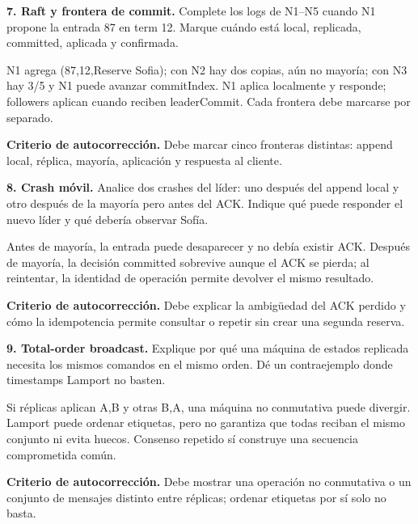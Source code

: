 \documentclass[variant=guiaresuelta,cover=institutional,mode=screen]{ua-engineering-v6-article}
\begin{document}
\begin{uaexercise}
\textbf{7. Raft y frontera de commit.} Complete los logs de N1--N5 cuando N1 propone la entrada 87 en term 12. Marque cuándo está local, replicada, committed, aplicada y confirmada.
\end{uaexercise}
\begin{uaanswer}
N1 agrega (87,12,Reserve Sofia); con N2 hay dos copias, aún no mayoría; con N3 hay 3/5 y N1 puede avanzar commitIndex. N1 aplica localmente y responde; followers aplican cuando reciben leaderCommit. Cada frontera debe marcarse por separado.

\par\smallskip\textbf{Criterio de autocorrección.} Debe marcar cinco fronteras distintas: append local, réplica, mayoría, aplicación y respuesta al cliente.
\end{uaanswer}

\begin{uaexercise}
\textbf{8. Crash móvil.} Analice dos crashes del líder: uno después del append local y otro después de la mayoría pero antes del ACK. Indique qué puede responder el nuevo líder y qué debería observar Sofía.
\end{uaexercise}
\begin{uaanswer}
Antes de mayoría, la entrada puede desaparecer y no debía existir ACK. Después de mayoría, la decisión committed sobrevive aunque el ACK se pierda; al reintentar, la identidad de operación permite devolver el mismo resultado.

\par\smallskip\textbf{Criterio de autocorrección.} Debe explicar la ambigüedad del ACK perdido y cómo la idempotencia permite consultar o repetir sin crear una segunda reserva.
\end{uaanswer}

\begin{uaexercise}
\textbf{9. Total-order broadcast.} Explique por qué una máquina de estados replicada necesita los mismos comandos en el mismo orden. Dé un contraejemplo donde timestamps Lamport no basten.
\end{uaexercise}
\begin{uaanswer}
Si réplicas aplican A,B y otras B,A, una máquina no conmutativa puede divergir. Lamport puede ordenar etiquetas, pero no garantiza que todas reciban el mismo conjunto ni evita huecos. Consenso repetido sí construye una secuencia comprometida común.

\par\smallskip\textbf{Criterio de autocorrección.} Debe mostrar una operación no conmutativa o un conjunto de mensajes distinto entre réplicas; ordenar etiquetas por sí solo no basta.
\end{uaanswer}
\end{document}
